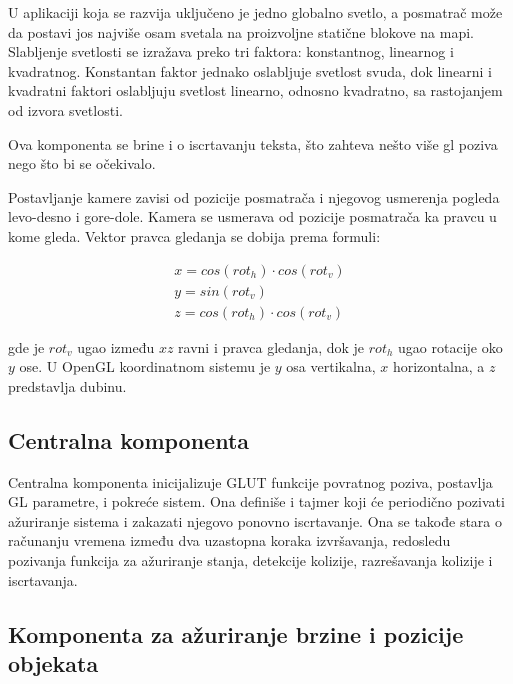 \documentclass[12pt,oneside]{memoir}
\begin{document}
U aplikaciji koja se razvija uključeno je jedno globalno svetlo, a posmatrač može da postavi jos najviše osam svetala na 
proizvoljne statične blokove na mapi. 
Slabljenje svetlosti se izražava preko tri faktora: konstantnog, linearnog i kvadratnog.
Konstantan faktor jednako oslabljuje svetlost svuda, dok linearni i kvadratni faktori oslabljuju svetlost
linearno, odnosno kvadratno, sa rastojanjem od izvora svetlosti.

Ova komponenta se brine i o iscrtavanju teksta, što zahteva nešto više gl poziva nego što bi se očekivalo.

Postavljanje kamere zavisi od pozicije posmatrača i njegovog usmerenja pogleda levo-desno i gore-dole.
Kamera se usmerava od pozicije posmatrača ka pravcu u kome gleda.
Vektor pravca gledanja se dobija prema formuli:

\begin{equation}
\label{eq:camera}
\begin{split}
x = cos(rot_h) \cdot cos(rot_v) \\
y = sin(rot_v) \\
z = cos(rot_h) \cdot  cos(rot_v)	
\end{split}
\end{equation}


\noindent gde je $rot_v$ ugao između $xz$ ravni i pravca gledanja, dok je $rot_h$ ugao rotacije oko $y$ ose.
U OpenGL koordinatnom sistemu je $y$ osa vertikalna, $x$ horizontalna, a $z$ predstavlja dubinu.

\subsection{Centralna komponenta}

Centralna komponenta inicijalizuje GLUT funkcije povratnog poziva, postavlja GL parametre, i pokreće sistem.
Ona definiše i tajmer koji će periodično pozivati ažuriranje sistema i zakazati njegovo ponovno iscrtavanje. 
Ona se takođe stara o računanju vremena između dva uzastopna koraka izvršavanja, redosledu pozivanja funkcija za ažuriranje stanja,
detekcije kolizije, razrešavanja kolizije i iscrtavanja.

\subsection{Komponenta za ažuriranje brzine i pozicije objekata}
\end{document}
